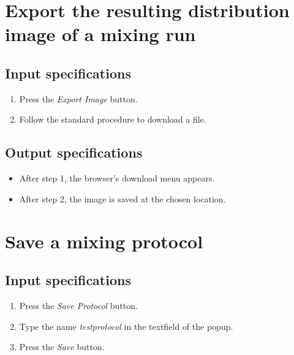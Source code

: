 \section{Export the resulting distribution image of a mixing run}

\subsection*{Input specifications}
\begin{enumerate}
\item Press the \emph{Export Image} button.
\item Follow the standard procedure to download a file.
\end{enumerate}

\subsection*{Output specifications}
\begin{itemize}
\item After step 1, the browser's download menu appears.
\item After step 2, the image is saved at the chosen location.
\end{itemize}

\section{Save a mixing protocol}

\subsection*{Input specifications}
\begin{enumerate}
\item Press the \emph{Save Protocol} button.
\item Type the name \emph{testprotocol} in the textfield of the popup.
\item Press the \emph{Save} button.
\end{enumerate}

